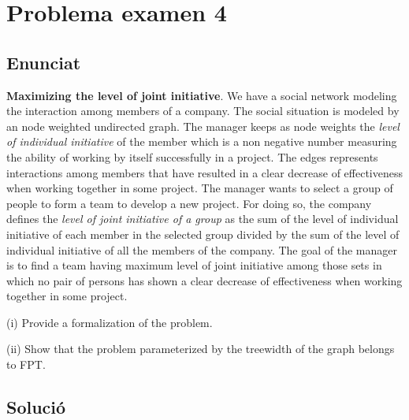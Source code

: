 \section{Problema examen 4}
\subsection{Enunciat}
\textbf{Maximizing the level of joint initiative}. We have a social network modeling the interaction among members of a company. The social situation is modeled by an node weighted undirected graph. The manager keeps as node weights the \textit{level of individual initiative} of the member which is a non negative number measuring the ability of working by itself successfully in a project. The edges represents interactions among members that have resulted in a clear decrease of effectiveness when working together in some project. The manager wants to select a group of people to form a team to develop a new project. For doing so, the company defines the \textit{level of joint initiative of a group} as the sum of the level of individual initiative of each member in the selected group divided by the sum of the level of individual initiative of all the members of the company. The goal of the manager is to find a team having maximum level of joint initiative among those sets in which no pair of persons has shown a clear decrease of effectiveness when working together in some project.

\vspace{5mm}
(i) Provide a formalization of the problem. 

\vspace{5mm}
(ii) Show that the problem parameterized by the treewidth of the graph belongs to FPT.

\subsection{Solució}